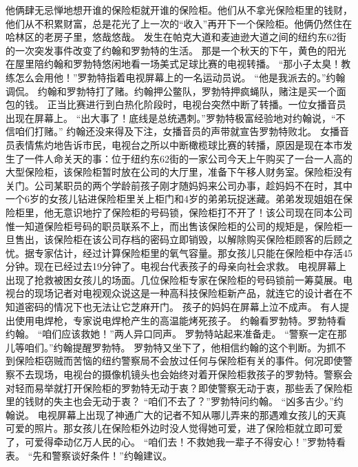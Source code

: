 \documentclass[a4paper,12pt,UTF8,twoside]{ctexbook}
\begin{document}
        他俩肆无忌惮地想开谁的保险柜就开谁的保险柜。他们从不拿光保险柜里的钱财，他们从不积累财富，总是花光了上一次的“收入”再开下一个保险柜。他俩仍然住在哈林区的老房子里，悠哉悠哉。  
        发生在帕克大道和麦迪逊大道之间的纽约东62街的一次突发事件改变了约翰和罗勃特的生活。  
        那是一个秋天的下午，黄色的阳光在屋里陪约翰和罗勃特悠闲地看一场美式足球比赛的电视转播。  
        “那小子太臭！教练怎么会用他！”罗勃特指着电视屏幕上的一名运动员说。  
        “他是我派去的。”约翰调侃。  
        约翰和罗勃特打了赌。约翰押公鳖队，罗勃特押疯蝇队，赌注是买一个面包的钱。  
        正当比赛进行到白热化阶段时，电视台突然中断了转播。一位女播音员出现在屏幕上。  
        “出大事了！底线是总统遇刺。”罗勃特极富经验地对约翰说，“不信咱们打赌。”  
        约翰还没来得及下注，女播音员的声带就宣告罗勃特败北。  
        女播音员表情焦灼地告诉市民，电视台之所以中断橄榄球比赛的转播，原因是现在本市发生了一件人命关天的事：位于纽约东62街的一家公司今天上午购买了一台一人高的大型保险柜，该保险柜暂时放在公司的大厅里，准备下午移人财务室。保险柜没有关门。公司某职员的两个学龄前孩子刚才随妈妈来公司办事，趁妈妈不在时，其中一个6岁的女孩儿钻进保险柜里关上柜门和4岁的弟弟玩捉迷藏。弟弟发现姐姐在保险柜里，他无意识地拧了保险柜的号码锁，保险柜打不开了！该公司现在同本公司惟一知道保险柜号码的职员联系不上，而出售该保险柜的公司的规矩是，保险柜一旦售出，该保险柜在该公司存档的密码立即销毁，以解除购买保险柜顾客的后顾之忧。据专家估计，经过计算保险柜里的氧气容量。那女孩儿只能在保险柜中存活45分钟。现在已经过去19分钟了。电视台代表孩子的母亲向社会求救。  
        电视屏幕上出现了抢救被困女孩儿的场面。几位保险柜专家在保险柜的号码锁前一筹莫展。电视台的现场记者对电视观众说这是一种高科技保险柜新产品，就连它的设计者在不知道密码的情况下也无法让它芝麻开门。  
        孩子的妈妈在屏幕上泣不成声。  
        有人提出使用电焊枪，专家说电焊枪产生的高温能烤死孩子。  
        约翰看罗勃特。罗勃特看约翰。  
        “咱们应该救她！”两人异口同声。  
        罗勃特站起来准备走。  
        “警察一定在那儿等咱们。”约翰提醒罗勃特。  
        罗勃特又坐下了，他相信约翰的这个判断。为抓不到保险柜窃贼而苦恼的纽约警察局不会放过任何与保险柜有关的事件。何况即使警察不去现场，电视台的摄像机镜头也会始终对着开保险柜救孩子的罗勃特。警察会对轻而易举就打开保险柜的罗勃特无动于衷？即使警察无动于衷，那些丢了保险柜里的钱财的失主也会无动于衷？  
        “咱们不去了？”罗勃特问约翰。  
        “凶多吉少。”约翰说。        
        电视屏幕上出现了神通广大的记者不知从哪儿弄来的那遇难女孩儿的天真可爱的照片。那女孩儿在保险柜外边时没人觉得她可爱，进了保险柜就立即可爱了，可爱得牵动亿万人民的心。  
        “咱们去！不救她我一辈子不得安心！”罗勃特看表。  
        “先和警察谈好条件！”约翰建议。  
\end{document}
